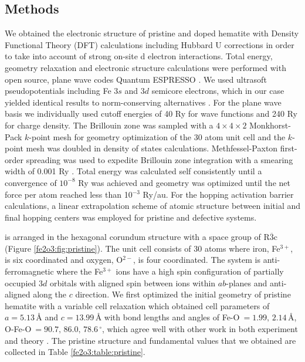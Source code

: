 \subsection{Methods}
We obtained the electronic structure of pristine and doped hematite with Density Functional Theory (DFT) calculations including Hubbard U corrections in order to take into account of strong on-site d electron interactions. Total energy, geometry relaxation and electronic structure calculations were performed with open source, plane wave codes Quantum ESPRESSO \cite{QE1}. We used ultrasoft pseudopotentials \cite{gbrv} including Fe $3s$ and $3d$ semicore electrons, which in our case yielded identical results to norm-conserving alternatives \cite{ONCV1,ONCV2}. For the plane wave basis we individually used cutoff energies of 40 Ry for wave functions and 240 Ry for charge density. The Brillouin zone was sampled with a $4\times4\times2$ Monkhorst-Pack $k$-point mesh for geometry optimization of the 30 atom unit cell and the $k$-point mesh was doubled in density of states calculations. Methfessel-Paxton first-order spreading was used to expedite Brillouin zone integration with a smearing width of 0.001 Ry \cite{methfessel1989high}. Total energy was calculated self consistently until a convergence of $10^{-8}$ Ry was achieved and geometry was optimized until the net force per atom reached less than 10$^{-3}$ Ry/au. For the hopping activation barrier calculations, a linear extrapolation scheme of atomic structure between initial and final hopping centers was employed for pristine and defective systems.

 is arranged in the hexagonal corundum structure with a space group of R$\overline{3}$c \cite{pauling1925crystal} (Figure \ref{fe2o3:fig:pristine}). The unit cell consists of 30 atoms where iron, Fe$^{3+}$, is six coordinated and oxygen, O$^{2-}$, is four coordinated. The system is anti-ferromagnetic where the Fe$^{3+}$ ions have a high spin configuration of partially occupied $3d$ orbitals with aligned spin between ions within $ab$-planes and anti-aligned along the $c$ direction. We first optimized the initial geometry of pristine hematite with a variable cell relaxation which obtained cell parameters of $a=5.13\,${\AA} and $c=13.99\,${\AA} with bond lengths and angles of Fe-O$\ = 1.99,\, 2.14\,${\AA}, O-Fe-O$\ = 90.7,\,86.0,\,78.6\, ^\circ$, which agree well with other work in both experiment \cite{finger1980crystal} and theory \cite{adelstein2014density}. The pristine structure and fundamental values that we obtained are collected in Table \ref{fe2o3:table:pristine}.\\

